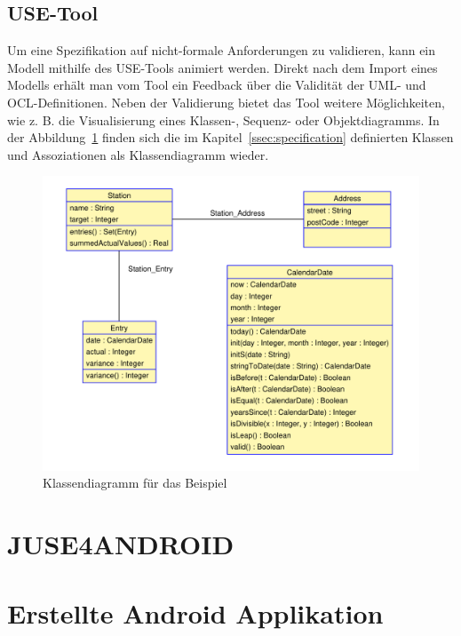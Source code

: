 \documentclass[a4paper,twoside]{article}
\begin{document}
\subsection{USE-Tool}

Um eine Spezifikation auf nicht-formale Anforderungen zu validieren, kann ein Modell mithilfe des USE-Tools animiert werden. Direkt nach dem Import eines Modells erhält man vom Tool ein Feedback über die Validität der UML- und OCL-Definitionen. Neben der Validierung bietet das Tool weitere Möglichkeiten, wie z. B. die Visualisierung eines Klassen-, Sequenz- oder Objektdiagramms. In der Abbildung~\ref{fig:Grafik2} finden sich die im Kapitel~\ref{ssec:specification} definierten Klassen und Assoziationen als Klassendiagramm wieder.

\begin{figure}[!h]
	\includegraphics[scale=.4]{pics/USE_class_diagramm.pdf}
	\caption{Klassendiagramm für das Beispiel}
	\label{fig:Grafik2}
\end{figure}


\section{\uppercase{JUSE4Android}}



\section{Erstellte Android Applikation}
\end{document}
